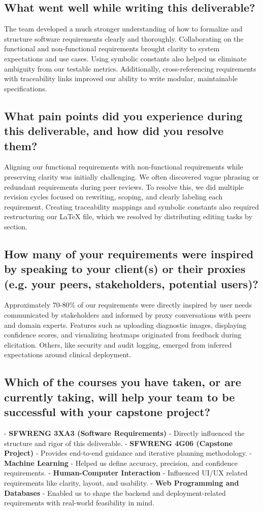 \documentclass[12pt]{article}
\begin{document}
\subsection*{What went well while writing this deliverable?}
The team developed a much stronger understanding of how to formalize and structure software requirements clearly and thoroughly. Collaborating on the functional and non-functional requirements brought clarity to system expectations and use cases. Using symbolic constants also helped us eliminate ambiguity from our testable metrics. Additionally, cross-referencing requirements with traceability links improved our ability to write modular, maintainable specifications.

\subsection*{What pain points did you experience during this deliverable, and how did you resolve them?}
Aligning our functional requirements with non-functional requirements while preserving clarity was initially challenging. We often discovered vague phrasing or redundant requirements during peer reviews. To resolve this, we did multiple revision cycles focused on rewriting, scoping, and clearly labeling each requirement. Creating traceability mappings and symbolic constants also required restructuring our LaTeX file, which we resolved by distributing editing tasks by section.

\subsection*{How many of your requirements were inspired by speaking to your client(s) or their proxies (e.g. your peers, stakeholders, potential users)?}
Approximately 70-80\% of our requirements were directly inspired by user needs communicated by stakeholders and informed by proxy conversations with peers and domain experts. Features such as uploading diagnostic images, displaying confidence scores, and visualizing heatmaps originated from feedback during elicitation. Others, like security and audit logging, emerged from inferred expectations around clinical deployment.

\subsection*{Which of the courses you have taken, or are currently taking, will help your team to be successful with your capstone project?}
- \textbf{SFWRENG 3XA3 (Software Requirements)} - Directly influenced the structure and rigor of this deliverable.
- \textbf{SFWRENG 4G06 (Capstone Project)} - Provides end-to-end guidance and iterative planning methodology.
- \textbf{Machine Learning} - Helped us define accuracy, precision, and confidence requirements.
- \textbf{Human-Computer Interaction} - Influenced UI/UX related requirements like clarity, layout, and usability.
- \textbf{Web Programming and Databases} - Enabled us to shape the backend and deployment-related requirements with real-world feasibility in mind.
\end{document}
